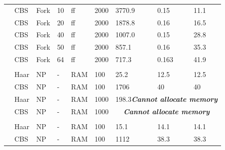 \documentclass[a4paper,11pt]{article}
\newcounter{magicrownumbers}
\newcommand\rownumber{\stepcounter{magicrownumbers}\arabic{magicrownumbers}}
\begin{document}
\begin{center}
\begin{threeparttable}
\begin{tabular}{lp{1.3cm}p{1.2cm}p{1.0cm}p{0.85cm}p{1.2cm}p{1.9cm}p{1.55cm}p{1.8cm}}
\rownumber&CBS & Fork &10  & ff & 2000 &3770.9 & 0.15 & 11.1 \\
\rownumber&CBS & Fork &20 & ff & 2000 & 1878.8 & 0.16 & 16.5 \\
\rownumber&CBS & Fork &40  & ff & 2000 & 1007.0 & 0.15 & 28.8 \\
\rownumber&CBS & Fork &50  & ff & 2000 & 857.1 & 0.16 & 35.3 \\
\rownumber&CBS & Fork & 64  & ff & 2000 & 717.3 & 0.163 & 41.9 \\

&&&&&&&\\


\rownumber&Haar & NP &-  &RAM  & 100 &  25.2\tnote{a}   & 12.5 & 12.5  \\
\rownumber&CBS     & NP &-  &RAM  & 100 & 1706\tnote{b}  &   40   &  40\\
\rownumber&Haar & NP &-  &RAM  & 1000 &
\multicolumn{3}{c}{198.3\tnote{c}\quad \textit{\textbf{Cannot allocate memory}}} \\
\rownumber&CBS     & NP &-  &RAM  & 1000 &
\multicolumn{3}{c}{\textit{\qquad\textbf{Cannot allocate memory}}}\\

&&&&&&&\\
\rownumber&Haar & NP &-  &RAM  & 100 &  15.1\tnote{d}   & 14.1 & 14.1  \\
\rownumber&CBS     & NP &-  &RAM  & 100 & 1112\tnote{e}  &   38.3   &  38.3\\


\hline
   

  \end{tabular}

  \begin{tablenotes}
    {\footnotesize

}
\end{tablenotes}
\end{threeparttable}
\end{center}
\end{document}
